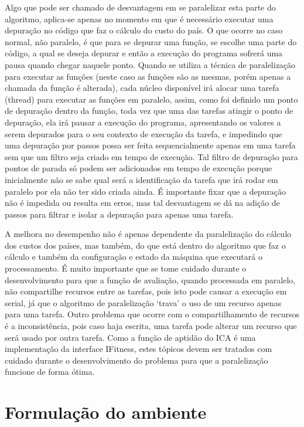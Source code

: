 Algo que pode ser chamado de desvantagem em se paralelizar esta parte do algoritmo, aplica-se apenas no momento em que é necessário executar uma depuração no código que faz o cálculo do custo do país. O que ocorre no caso normal, não paralelo, é que para se depurar uma função, se escolhe uma parte do código, a qual se deseja depurar e então a execução do programa sofrerá uma pausa quando chegar naquele ponto. Quando se utiliza a técnica de paralelização para executar as funções (neste caso as funções são as mesmas, porém apenas a chamada da função é alterada), cada núcleo disponível irá alocar uma tarefa (thread) para executar as funções em paralelo, assim, como foi definido um ponto de depuração dentro da função, toda vez que uma das tarefas atingir o ponto de depuração, ela irá pausar a execução do programa, apresentando os valores a serem depurados para o seu contexto de execução da tarefa, e impedindo que uma depuração por passos possa ser feita sequencialmente apenas em uma tarefa sem que um filtro seja criado em tempo de execução. Tal filtro de depuração para pontos de parada só podem ser adicionados em tempo de execução porque inicialmente não se sabe qual será a identificação da tarefa que irá rodar em paralelo por ela não ter sido criada ainda. É importante fixar que a depuração não é impedida ou resulta em erros, mas tal desvantagem se dá na adição de passos para filtrar e isolar a depuração para apenas uma tarefa.


A melhora no desempenho não é apenas dependente da paralelização do cálculo dos custos dos países, mas também, do que está dentro do algoritmo que faz o cálculo e também da configuração e estado da máquina que executará o processamento. É muito importante que se tome cuidado durante o desenvolvimento para que a função de avaliação, quando processada em paralelo, não compartilhe recursos entre as tarefas, pois isto pode causar a execução em serial, já que o algoritmo de paralelização ‘trava’ o uso de um recurso apenas para uma tarefa. Outro problema que ocorre com o compartilhamento de recursos é a inconsistência, pois caso haja escrita, uma tarefa pode alterar um recurso que será usado por outra tarefa. Como a função de aptidão do ICA é uma implementação da interface IFitness, estes tópicos devem ser tratados com cuidado durante o desenvolvimento do problema para que a paralelização funcione de forma ótima.




\section{Formulação do ambiente}
\label{Formulação do ambiente}


